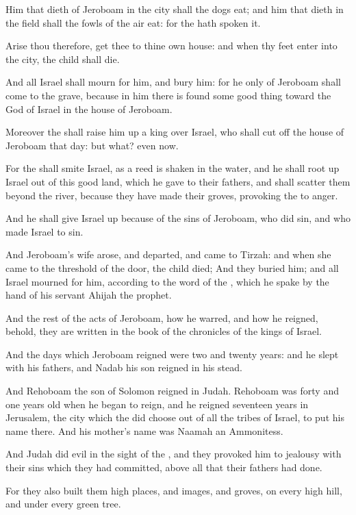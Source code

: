 \Verse Him that dieth of Jeroboam in the city shall the dogs eat; and him that dieth in the field shall the fowls of the air eat: for the \LORD hath spoken it.

\Verse Arise thou therefore, get thee to thine own house: and when thy feet enter into the city, the child shall die.

\Verse And all Israel shall mourn for him, and bury him: for he only of Jeroboam shall come to the grave, because in him there is found some good thing toward the \LORD God of Israel in the house of Jeroboam.

\Verse Moreover the \LORD shall raise him up a king over Israel, who shall cut off the house of Jeroboam that day: but what? even now.

\Verse For the \LORD shall smite Israel, as a reed is shaken in the water, and he shall root up Israel out of this good land, which he gave to their fathers, and shall scatter them beyond the river, because they have made their groves, provoking the \LORD to anger.

\Verse And he shall give Israel up because of the sins of Jeroboam, who did sin, and who made Israel to sin.

\Verse And Jeroboam's wife arose, and departed, and came to Tirzah: and when she came to the threshold of the door, the child died; \Verse And they buried him; and all Israel mourned for him, according to the word of the \LORD, which he spake by the hand of his servant Ahijah the prophet.

\Verse And the rest of the acts of Jeroboam, how he warred, and how he reigned, behold, they are written in the book of the chronicles of the kings of Israel.

\Verse And the days which Jeroboam reigned were two and twenty years: and he slept with his fathers, and Nadab his son reigned in his stead.

\Verse And Rehoboam the son of Solomon reigned in Judah. Rehoboam was forty and one years old when he began to reign, and he reigned seventeen years in Jerusalem, the city which the \LORD did choose out of all the tribes of Israel, to put his name there. And his mother's name was Naamah an Ammonitess.

\Verse And Judah did evil in the sight of the \LORD, and they provoked him to jealousy with their sins which they had committed, above all that their fathers had done.

\Verse For they also built them high places, and images, and groves, on every high hill, and under every green tree.

